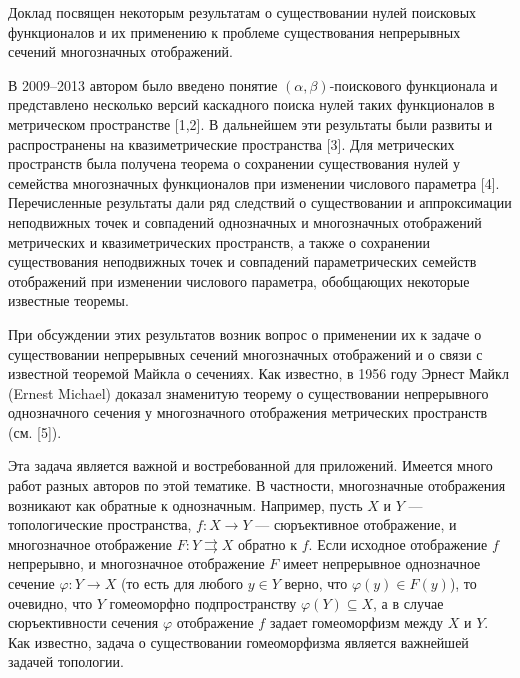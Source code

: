 \documentclass{vzmsthesis}
\begin{document}

\vzmscaption

Доклад посвящен некоторым результатам о существовании нулей поисковых функционалов и их применению к проблеме существования непрерывных сечений многозначных отображений.

В 2009--2013 автором было введено понятие  $(\alpha,\beta)$-по\-ис\-ко\-во\-го функционала и представлено несколько версий каскадного поиска нулей таких функционалов в метрическом пространстве [1,2]. В дальнейшем эти результаты были развиты и распространены на квазиметрические пространства [3]. Для метрических пространств была получена теорема о сохранении существования нулей у семейства многозначных функционалов при изменении числового параметра [4]. Перечисленные результаты дали ряд следствий о существовании и аппроксимации неподвижных точек и совпадений однозначных и многозначных отображений метрических и квазиметрических пространств, а также о сохранении существования неподвижных точек и совпадений параметрических семейств  отображений при изменении числового параметра, обобщающих некоторые известные теоремы.

При обсуждении этих результатов возник вопрос о применении их к задаче о существовании непрерывных сечений многозначных отображений и о связи с известной теоремой Майкла о сечениях. Как известно, в  1956 году Эрнест Майкл (Ernest Michael)  доказал знаменитую теорему о существовании непрерывно\-го однозначного сечения у многозначного отображения метрических прост\-ранств (см. [5]).

Эта задача  является важной и востребованной для приложений. Имеется много работ разных авторов по этой тематике. В частности, многозначные отображения возникают как обратные к однозначным. Например, пусть $X$ и $Y$ --- топологические пространства, $f: X\to Y$ --- сюръективное отображение, и многозначное отображение $F: Y\rightrightarrows X$  обратно к $f$. Если исходное отображение $f$ непрерывно, и многозначное отображение $F$ имеет непрерывное однозначное сечение $\varphi: Y\to X$ (то есть для любого $y\in Y$ верно, что $\varphi(y)\in F(y)$), то очевидно, что $Y$ гомеоморфно подпространству $\varphi(Y)\subseteq X$, а в случае сюръективности сечения $\varphi$ отображение $f$ задает гомеоморфизм между $X$ и $Y$. Как известно, задача о существовании гомеоморфизма является важнейшей задачей топологии.
\end{document}
